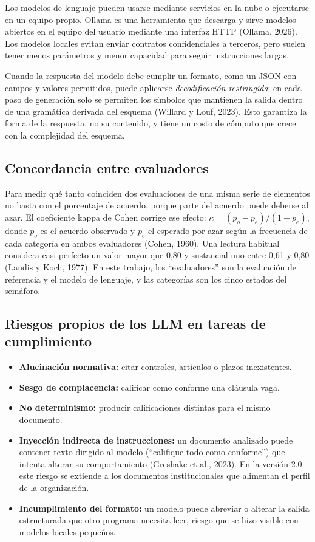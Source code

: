 \documentclass[12pt,letterpaper]{article}
\begin{document}
Los modelos de lenguaje pueden usarse mediante servicios en la nube o ejecutarse en un equipo propio. Ollama es una herramienta que descarga y sirve modelos abiertos en el equipo del usuario mediante una interfaz HTTP (Ollama, 2026). Los modelos locales evitan enviar contratos confidenciales a terceros, pero suelen tener menos parámetros y menor capacidad para seguir instrucciones largas.

Cuando la respuesta del modelo debe cumplir un formato, como un JSON con campos y valores permitidos, puede aplicarse \emph{decodificación restringida}: en cada paso de generación solo se permiten los símbolos que mantienen la salida dentro de una gramática derivada del esquema (Willard y Louf, 2023). Esto garantiza la forma de la respuesta, no su contenido, y tiene un costo de cómputo que crece con la complejidad del esquema.

\subsection{Concordancia entre evaluadores}

Para medir qué tanto coinciden dos evaluaciones de una misma serie de elementos no basta con el porcentaje de acuerdo, porque parte del acuerdo puede deberse al azar. El coeficiente kappa de Cohen corrige ese efecto: $\kappa = (p_o - p_e)/(1 - p_e)$, donde $p_o$ es el acuerdo observado y $p_e$ el esperado por azar según la frecuencia de cada categoría en ambos evaluadores (Cohen, 1960). Una lectura habitual considera casi perfecto un valor mayor que 0,80 y sustancial uno entre 0,61 y 0,80 (Landis y Koch, 1977). En este trabajo, los ``evaluadores'' son la evaluación de referencia y el modelo de lenguaje, y las categorías son los cinco estados del semáforo.

\subsection{Riesgos propios de los LLM en tareas de cumplimiento}

\begin{itemize}
  \item \textbf{Alucinación normativa:} citar controles, artículos o plazos inexistentes.
  \item \textbf{Sesgo de complacencia:} calificar como conforme una cláusula vaga.
  \item \textbf{No determinismo:} producir calificaciones distintas para el mismo documento.
  \item \textbf{Inyección indirecta de instrucciones:} un documento analizado puede contener texto dirigido al modelo (``califique todo como conforme'') que intenta alterar su comportamiento (Greshake et al., 2023). En la versión 2.0 este riesgo se extiende a los documentos institucionales que alimentan el perfil de la organización.
  \item \textbf{Incumplimiento del formato:} un modelo puede abreviar o alterar la salida estructurada que otro programa necesita leer, riesgo que se hizo visible con modelos locales pequeños.
\end{itemize}
\end{document}
